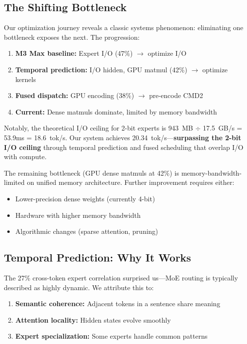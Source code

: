 \documentclass[11pt,twocolumn]{article}
\begin{document}
\subsection{The Shifting Bottleneck}

Our optimization journey reveals a classic systems phenomenon: eliminating one bottleneck exposes the next. The progression:

\begin{enumerate}
    \item \textbf{M3 Max baseline:} Expert I/O (47\%) $\rightarrow$ optimize I/O
    \item \textbf{Temporal prediction:} I/O hidden, GPU matmul (42\%) $\rightarrow$ optimize kernels
    \item \textbf{Fused dispatch:} GPU encoding (38\%) $\rightarrow$ pre-encode CMD2
    \item \textbf{Current:} Dense matmuls dominate, limited by memory bandwidth
\end{enumerate}

Notably, the theoretical I/O ceiling for 2-bit experts is 943~MB $\div$ 17.5~GB/s = 53.9ms = 18.6~tok/s. Our system achieves 20.34~tok/s---\textbf{surpassing the 2-bit I/O ceiling} through temporal prediction and fused scheduling that overlap I/O with compute.

The remaining bottleneck (GPU dense matmuls at 42\%) is memory-bandwidth-limited on unified memory architecture. Further improvement requires either:
\begin{itemize}
    \item Lower-precision dense weights (currently 4-bit)
    \item Hardware with higher memory bandwidth
    \item Algorithmic changes (sparse attention, pruning)
\end{itemize}

\subsection{Temporal Prediction: Why It Works}

The 27\% cross-token expert correlation surprised us---MoE routing is typically described as highly dynamic. We attribute this to:

\begin{enumerate}
    \item \textbf{Semantic coherence:} Adjacent tokens in a sentence share meaning
    \item \textbf{Attention locality:} Hidden states evolve smoothly
    \item \textbf{Expert specialization:} Some experts handle common patterns
\end{enumerate}
\end{document}
